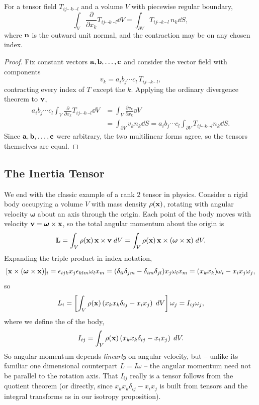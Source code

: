 \documentclass[a4paper]{scrartcl}
\begin{document}
\begin{theorem}
	For a tensor field $T_{ij \cdots k \cdots l}$ and a volume $V$ with piecewise regular boundary,
	$$
	\int_V \frac{\partial}{\partial x_k} T_{ij\cdots k \cdots l} \dd V = \int_{\partial V} T_{ij \cdots k \cdots l} \, n_k \dd S,
	$$
	where $\mathbf{n}$ is the outward unit normal, and the contraction may be on any chosen index.
\end{theorem}
\begin{proof}
	Fix constant vectors $\mathbf{a}, \mathbf{b}, \dots, \mathbf{c}$ and consider the vector field with components
	$$
	v_k = a_i b_j \cdots c_l \, T_{ij \cdots k \cdots l},
	$$
	contracting every index of $T$ except the $k$. Applying the ordinary divergence theorem to $\mathbf{v}$,
	\begin{align*}
		a_i b_j \cdots c_l \int_V \frac{\partial}{\partial x_k} T_{ij \cdots k \cdots l} \dd V &= \int_V \frac{\partial v_k}{\partial x_k} \dd V \\
		&= \int_{\partial V} v_k n_k \dd S = a_i b_j \cdots c_l \int_{\partial V} T_{ij\cdots k \cdots l} n_k \dd S.
	\end{align*}
	Since $\mathbf{a}, \mathbf{b}, \dots, \mathbf{c}$ were arbitrary, the two multilinear forms agree, so the tensors themselves are equal.
\end{proof}

\subsection{The Inertia Tensor}

We end with the classic example of a rank $2$ tensor in physics. Consider a rigid body occupying a volume $V$ with mass density $\rho(\mathbf{x})$, rotating with angular velocity $\boldsymbol{\omega}$ about an axis through the origin. Each point of the body moves with velocity $\mathbf{v} = \boldsymbol{\omega} \times \mathbf{x}$, so the total angular momentum about the origin is
$$
\mathbf{L} = \int_V \rho(\mathbf{x}) \, \mathbf{x} \times \mathbf{v} \; d V = \int_V \rho(\mathbf{x}) \, \mathbf{x} \times (\boldsymbol{\omega} \times \mathbf{x}) \; d V.
$$
Expanding the triple product in index notation,
$$
[\mathbf{x} \times (\boldsymbol{\omega} \times \mathbf{x})]_i = \epsilon_{ijk} x_j \epsilon_{klm} \omega_l x_m = (\delta_{il}\delta_{jm} - \delta_{im}\delta_{jl}) x_j \omega_l x_m = (x_k x_k) \omega_i - x_i x_j \omega_j,
$$
so
$$
L_i = \left[\int_V \rho(\mathbf{x}) \left(x_k x_k \delta_{ij} - x_i x_j\right) \; d V \right] \omega_j = I_{ij} \omega_j,
$$
where we define the  of the body,
$$
I_{ij} = \int_V \rho(\mathbf{x}) \left(x_k x_k \delta_{ij} - x_i x_j\right) \; d V.
$$
So angular momentum depends \emph{linearly} on angular velocity, but -- unlike its familiar one dimensional counterpart $L = I\omega$ -- the angular momentum need not be parallel to the rotation axis. That $I_{ij}$ really is a tensor follows from the quotient theorem (or directly, since $x_kx_k\delta_{ij} - x_ix_j$ is built from tensors and the integral transforms as in our isotropy proposition).
\end{document}
